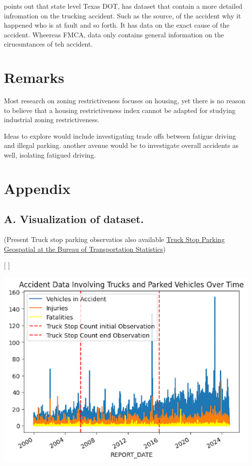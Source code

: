 \documentclass[
  12pt]{article}
\begin{document}
\citet{liangSafetyInspectionsImprove2021} points out that state level
Texas DOT, has dataset that contain a more detailed infromation on the
trucking accident. Such as the source, of the accident why it happened
who is at fault and so forth. It has data on the exact cause of the
accident. Wheereas FMCA, data only contains general information on the
cirucsmtances of teh accident.

\section{Remarks}\label{remarks}

Most research on zoning restrictiveness focuses on housing, yet there is
no reason to believe that a housing restrictiveness index cannot be
adapted for studying industrial zoning restrictiveness.

Ideas to explore would include investigating trade offs between fatigue
driving and illegal parking. another avenue would be to investigate
overall accidents as well, isolating fatigued driving.

\section{\texorpdfstring{\textbf{Appendix}}{Appendix}}\label{appendix}

\subsection{\texorpdfstring{\textbf{A. Visualization of
dataset.}}{A. Visualization of dataset.}}\label{sec-a.-visualization-of-dataset.-}

(Present Truck stop parking observatios also available
\href{https://data-usdot.opendata.arcgis.com/datasets/usdot::truck-stop-parking/about}{Truck
Stop Parking \textbar{} Geospatial at the Bureau of Transportation
Statistics})

{[} \citet{coWilliamClintCResearchProposalTrucks2024}{]}

\includegraphics{images/unnamed.png}
\end{document}
